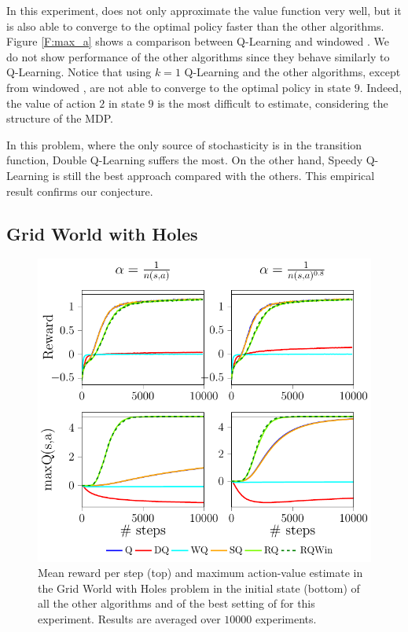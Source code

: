 \documentclass[conference]{IEEEtran}
\begin{document}
In this experiment, \alg does not only approximate the value function very well, but it is also able to converge to the optimal policy faster than the other algorithms. Figure \ref{F:max_a} shows a comparison between Q-Learning and windowed \alg. We do not show performance of the other algorithms since they behave similarly to Q-Learning. Notice that using $k = 1$ Q-Learning and the other algorithms, except from windowed \alg, are not able to converge to the optimal policy in state $9$. Indeed, the value of action $2$ in state $9$ is the most difficult to estimate, considering the structure of the MDP.

In this problem, where the only source of stochasticity is in the transition function, Double Q-Learning suffers the most. On the other hand, Speedy Q-Learning is still the best approach compared with the others. This empirical result confirms our conjecture.
\subsection{Grid World with Holes}
\begin{figure}[t]
\begin{minipage}{\columnwidth}
\centering
  \includegraphics[scale=.7]{./imgs/gridHole/grid_hole.pdf}
\end{minipage}
  \caption{Mean reward per step (top) and maximum action-value estimate in the Grid World with Holes problem in the initial state (bottom) of all the other algorithms and of the best setting of \alg for this experiment. Results are averaged over $10000$ experiments.}
  \label{F:hole}
\end{figure}
\end{document}
